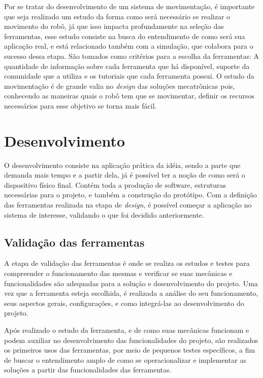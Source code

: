 Por se tratar do desenvolvimento de um sistema de movimentação, é importante que seja realizado um estudo da forma como será necessário se realizar o movimento do robô, já que isso impacta profundamente na seleção das ferramentas, esse estudo consiste na busca do entendimento de como será sua aplicação real, e está relacionado também com a simulação, que colabora para o sucesso dessa etapa. São tomados como critérios para a escolha da ferramentas: A quantidade de informação sobre cada ferramenta que há disponível, suporte da comunidade que a utiliza e os tutoriais que cada ferramenta possui. O estudo da movimentação é de grande valia no \textit{design} das soluções mecatrônicas pois, conhecendo as maneiras quais o robô tem que se movimentar, definir os recursos necessários para esse objetivo se torna mais fácil.

\section{Desenvolvimento}
\label{sec:Desen}
O desenvolvimento consiste na aplicação prática da idéia, sendo a parte que demanda mais tempo e a partir dela, já é possível ter a noção de como será o dispositivo físico final. Contém toda a produção de software, estruturas necessárias para o projeto, e também a construção do protótipo. Com a definição das ferramentas realizada na etapa de \textit{design}, é possível começar a aplicação no sistema de interesse, validando o que foi decidido anteriormente.

\subsection{Validação das ferramentas}
\label{ssec:val_ferra}
A etapa de validação das ferramentas é onde se realiza os estudos e testes para compreender o funcionamento das mesmas e verificar se suas mecânicas e funcionalidades são adequadas para a solução e desenvolvimento do projeto. Uma vez que a ferramenta esteja escolhida, é realizada a análise do seu funcionamento, seus aspectos gerais, configurações, e como integrá-las ao desenvolvimento do projeto.

Após realizado o estudo da ferramenta, e de como suas mecânicas funcionam e podem auxiliar no desenvolvimento das funcionalidades do projeto, são realizados os primeiros usos das ferramentas, por meio de pequenos testes específicos, a fim de buscar o entendimento amplo de como se operacionalizar e implementar as soluções a partir das funcionalidades das ferramentas. 

